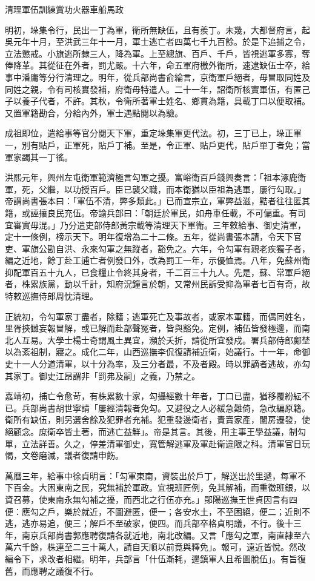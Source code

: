 清理軍伍訓練賞功火器車船馬政

明初，垛集令行，民出一丁為軍，衛所無缺伍，且有羨丁。未幾，大都督府言，起吳元年十月，至洪武三年十一月，軍士逃亡者四萬七千九百餘。於是下追捕之令，立法懲戒。小旗逃所隸三人，降為軍。上至總旗、百戶、千戶，皆視逃軍多寡，奪俸降革。其從征在外者，罰尤嚴。十六年，命五軍府檄外衛所，速逮缺伍士卒，給事中潘庸等分行清理之。明年，從兵部尚書俞綸言，京衛軍戶絕者，毋冒取同姓及同姓之親，令有司核實發補，府衛毋特遣人。二十一年，詔衛所核實軍伍，有匿己子以養子代者，不許。其秋，令衛所著軍士姓名、鄉貫為籍，具載丁口以便取補。又置軍籍勘合，分給內外，軍士遇點閱以為驗。

成祖即位，遣給事等官分閱天下軍，重定垛集軍更代法。初，三丁已上，垛正軍一，別有貼戶，正軍死，貼戶丁補。至是，令正軍、貼戶更代，貼戶單丁者免；當軍家蠲其一丁徭。

洪熙元年，興州左屯衛軍範濟極言勾軍之擾。富峪衛百戶錢興奏言：「祖本涿鹿衛軍，死，父繼，以功授百戶。臣已襲父職，而本衛猶以臣祖為逃軍，屢行勾取。」帝謂尚書張本曰：「軍伍不清，弊多類此。」已而宣宗立，軍弊益滋，黠者往往匿其籍，或誣攘良民充伍。帝諭兵部曰：「朝廷於軍民，如舟車任載，不可偏重。有司宜審實毋混。」乃分遣吏部侍郎黃宗載等清理天下軍衛。三年敕給事、御史清軍，定十一條例，榜示天下。明年復增為二十二條。五年，從尚書張本請，令天下官吏、軍旗公勘自洪、永來勾軍之無蹤者，豁免之。六年，令勾軍有親老疾獨子者，編之近地，餘丁赴工逋亡者例發口外，改為罰工一年，示優恤焉。八年，免蘇州衛抑配軍百五十九人，已食糧止令終其身者，千二百三十九人。先是，蘇、常軍戶絕者，株累族黨，動以千計，知府況鐘言於朝，又常州民訴受抑為軍者七百有奇，故特敕巡撫侍郎周忱清理。

正統初，令勾軍家丁盡者，除籍；逃軍死亡及事故者，或家本軍籍，而偶同姓名，里胥挾讎妄報冒解，或已解而赴部聲冤者，皆與豁免。定例，補伍皆發極邊，而南北人互易。大學士楊士奇謂風土異宜，瀕於夭折，請從所宜發戍。署兵部侍郎鄺埜以為紊祖制，寢之。成化二年，山西巡撫李侃復請補近衛，始議行。十一年，命御史十一人分道清軍，以十分為率，及三分者最，不及者殿。時以罪謫者逃故，亦勾其家丁。御史江昂謂非「罰弗及嗣」之義，乃禁之。

嘉靖初，捕亡令愈苛，有株累數十家，勾攝經數十年者，丁口已盡，猶移覆紛紜不已。兵部尚書胡世寧請「屢經清報者免勾。又避役之人必緩急難倚，急改編原籍。衛所有缺伍，則另選舍餘及犯罪者充補。犯重發邊衛者，責賣家產，闔房遷發，使絕顧念。庶衛卒皆土著，而逃亡益鮮」。帝是其言。其後，用主事王學益議，制勾單，立法詳善。久之，停差清軍御史，寬管解逃軍及軍赴衛違限之科。清軍官日玩愒，文卷磨滅，議者復請申飭。

萬曆三年，給事中徐貞明言：「勾軍東南，資裝出於戶丁，解送出於里遞，每軍不下百金。大困東南之民，究無補於軍政。宜視班匠例，免其解補，而重徵班銀，以資召募，使東南永無勾補之擾，而西北之行伍亦充。」鄖陽巡撫王世貞因言有四便：應勾之戶，樂於就近，不圖避匿，便一；各安水土，不至困絕，便二；近則不逃，逃亦易追，便三；解戶不至破家，便四。而兵部卒格貞明議，不行。後十三年，南京兵部尚書郭應聘復請各就近地，南北改編。又言「應勾之軍，南直隸至六萬六千餘，株連至二三十萬人，請自天順以前竟與釋免」。報可，遠近皆悅。然改編令下，求改者相繼。明年，兵部言「什伍漸耗，邊鎮軍人且希圖脫伍」。有旨復舊，而應聘之議復不行。

